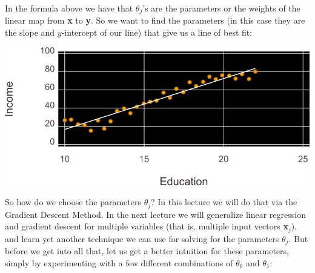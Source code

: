 \documentclass[11pt,a4paper,oneside]{report}
\begin{document}
In the formula above we have that $\theta_j$'s are the parameters or the weights of the linear map from {\bf x} to {\bf y}. So we want to find the parameters (in this case they are the slope and $y$-intercept of our line) that give us a line of best fit:
\begin{center}
\includegraphics[scale=1.3]{myplot.png}
\end{center}

So how do we choose the parameters $\theta_j$? In this lecture we will do that via the Gradient Descent Method. In the next lecture we will generalize linear regression and gradient descent for multiple variables (that is, multiple input vectors {\bf x}$_j$), and learn yet another technique we can use for solving for the parameters $\theta_j$. But before we get into all that, let us get a better intuition for these parameters, simply by experimenting with a few different combinations of $\theta_0$ and $\theta_1$:\\
\end{document}
